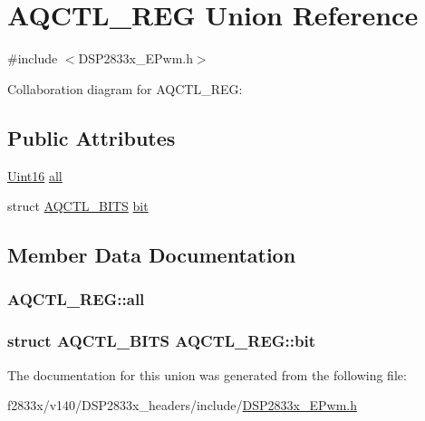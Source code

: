\hypertarget{union_a_q_c_t_l___r_e_g}{}\section{A\+Q\+C\+T\+L\+\_\+\+R\+E\+G Union Reference}
\label{union_a_q_c_t_l___r_e_g}


{\ttfamily \#include $<$D\+S\+P2833x\+\_\+\+E\+Pwm.\+h$>$}



Collaboration diagram for A\+Q\+C\+T\+L\+\_\+\+R\+E\+G\+:
\subsection*{Public Attributes}
\begin{DoxyCompactItemize}
\item 
\hyperlink{_d_s_p2833x___device_8h_a59a9f6be4562c327cbfb4f7e8e18f08b}{Uint16} \hyperlink{union_a_q_c_t_l___r_e_g_ada5eb92628cb6a3eb32b0918fc7053c0}{all}
\item 
struct \hyperlink{struct_a_q_c_t_l___b_i_t_s}{A\+Q\+C\+T\+L\+\_\+\+B\+I\+T\+S} \hyperlink{union_a_q_c_t_l___r_e_g_af034f5bceb4148b2aa0933540354c689}{bit}
\end{DoxyCompactItemize}


\subsection{Member Data Documentation}
\hypertarget{union_a_q_c_t_l___r_e_g_ada5eb92628cb6a3eb32b0918fc7053c0}{}
\subsubsection[{all}]{ A\+Q\+C\+T\+L\+\_\+\+R\+E\+G\+::all}\label{union_a_q_c_t_l___r_e_g_ada5eb92628cb6a3eb32b0918fc7053c0}
\hypertarget{union_a_q_c_t_l___r_e_g_af034f5bceb4148b2aa0933540354c689}{}
\subsubsection[{bit}]{\setlength{\rightskip}{0pt plus 5cm}struct {\bf A\+Q\+C\+T\+L\+\_\+\+B\+I\+T\+S} A\+Q\+C\+T\+L\+\_\+\+R\+E\+G\+::bit}\label{union_a_q_c_t_l___r_e_g_af034f5bceb4148b2aa0933540354c689}


The documentation for this union was generated from the following file\+:\begin{DoxyCompactItemize}
\item 
f2833x/v140/\+D\+S\+P2833x\+\_\+headers/include/\hyperlink{_d_s_p2833x___e_pwm_8h}{D\+S\+P2833x\+\_\+\+E\+Pwm.\+h}\end{DoxyCompactItemize}
